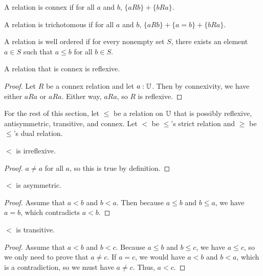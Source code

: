 \documentclass[../math.tex]{subfiles}
\begin{document}
\begin{class}
    A relation is connex if for all $a$ and $b$, $\{aRb\} + \{bRa\}$.
\end{class}

\begin{class}
    A relation is trichotomous if for all $a$ and $b$, $\{aRb\} + \{a = b\} +
    \{bRa\}$.
\end{class}

\begin{class}
    A relation is well ordered if for every nonempty set $S$, there exists an
    element $a \in S$ such that $a \leq b$ for all $b \in S$.
\end{class}

\begin{instance}
    A relation that is connex is reflexive.
\end{instance}
\begin{proof}
    Let $R$ be a connex relation and let $a : \mathbb{U}$.  Then by connexivity, we have
    either $aRa$ or $aRa$.  Either way, $aRa$, so $R$ is reflexive.
\end{proof}

For the rest of this section, let $\leq$ be a relation on $\mathbb{U}$ that is possibly
reflexive, antisymmetric, transitive, and connex.  Let $<$ be $\leq$'s strict
relation and $\geq$ be $\leq$'s dual relation.

\begin{instance}
    $<$ is irreflexive.
\end{instance}
\begin{proof}
    $a \neq a$ for all $a$, so this is true by definition.
\end{proof}

\begin{instance}
    $<$ is asymmetric.
\end{instance}
\begin{proof}
    Assume that $a < b$ and $b < a$.  Then because $a \leq b$ and $b \leq a$, we
    have $a = b$, which contradicts $a < b$.
\end{proof}

\begin{instance}
    $<$ is transitive.
\end{instance}
\begin{proof}
    Assume that $a < b$ and $b < c$.  Because $a \leq b$ and $b \leq c$, we have
    $a \leq c$, so we only need to prove that $a \neq c$.  If $a = c$, we would
    have $a < b$ and $b < a$, which is a contradiction, so we must have $a \neq
    c$.  Thus, $a < c$.
\end{proof}
\end{document}
